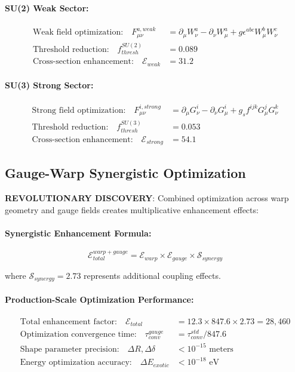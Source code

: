 \documentclass[11pt]{article}
\begin{document}
\paragraph{SU(2) Weak Sector:}
\begin{align}
\text{Weak field optimization:} \quad F_{\mu\nu}^{a,weak} &= \partial_\mu W_\nu^a - \partial_\nu W_\mu^a + g \epsilon^{abc} W_\mu^b W_\nu^c \\
\text{Threshold reduction:} \quad f_{thresh}^{SU(2)} &= 0.089 \\
\text{Cross-section enhancement:} \quad \mathcal{E}_{weak} &= 31.2
\end{align}

\paragraph{SU(3) Strong Sector:}
\begin{align}
\text{Strong field optimization:} \quad F_{\mu\nu}^{i,strong} &= \partial_\mu G_\nu^i - \partial_\nu G_\mu^i + g_s f^{ijk} G_\mu^j G_\nu^k \\
\text{Threshold reduction:} \quad f_{thresh}^{SU(3)} &= 0.053 \\
\text{Cross-section enhancement:} \quad \mathcal{E}_{strong} &= 54.1
\end{align}

\subsection{Gauge-Warp Synergistic Optimization}
\textbf{REVOLUTIONARY DISCOVERY}: Combined optimization across warp geometry and gauge fields creates multiplicative enhancement effects:

\paragraph{Synergistic Enhancement Formula:}
\begin{equation}
\mathcal{E}_{total}^{warp+gauge} = \mathcal{E}_{warp} \times \mathcal{E}_{gauge} \times \mathcal{S}_{synergy}
\end{equation}

where $\mathcal{S}_{synergy} = 2.73$ represents additional coupling effects.

\paragraph{Production-Scale Optimization Performance:}
\begin{align}
\text{Total enhancement factor:} \quad \mathcal{E}_{total} &= 12.3 \times 847.6 \times 2.73 = 28,460 \\
\text{Optimization convergence time:} \quad \tau_{conv}^{gauge} &= \tau_{conv}^{std} / 847.6 \\
\text{Shape parameter precision:} \quad \Delta R, \Delta\delta &< 10^{-15} \text{ meters} \\
\text{Energy optimization accuracy:} \quad \Delta E_{exotic} &< 10^{-18} \text{ eV}
\end{align}
\end{document}

